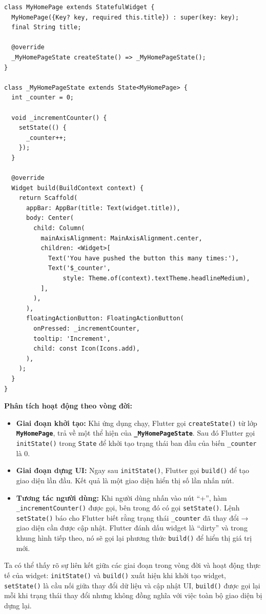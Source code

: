 \documentclass[../DoAn.tex]{subfiles}
\numberwithin{figure}{chapter}
\begin{document}
\begin{lstlisting}
class MyHomePage extends StatefulWidget {
  MyHomePage({Key? key, required this.title}) : super(key: key);
  final String title;

  @override
  _MyHomePageState createState() => _MyHomePageState();
}

class _MyHomePageState extends State<MyHomePage> {
  int _counter = 0;

  void _incrementCounter() {
    setState(() {
      _counter++;
    });
  }

  @override
  Widget build(BuildContext context) {
    return Scaffold(
      appBar: AppBar(title: Text(widget.title)),
      body: Center(
        child: Column(
          mainAxisAlignment: MainAxisAlignment.center,
          children: <Widget>[
            Text('You have pushed the button this many times:'),
            Text('$_counter',
                style: Theme.of(context).textTheme.headlineMedium),
          ],
        ),
      ),
      floatingActionButton: FloatingActionButton(
        onPressed: _incrementCounter,
        tooltip: 'Increment',
        child: const Icon(Icons.add),
      ),
    );
  }
}
\end{lstlisting}

\textbf{Phân tích hoạt động theo vòng đời:}

\begin{itemize}
\item \textbf{Giai đoạn khởi tạo: } Khi ứng dụng chạy, Flutter gọi  \texttt{createState()} từ lớp \textbf{\texttt{MyHomePage}}, trả về một thể hiện của \textbf{\texttt{\_MyHomePageState}}. Sau đó Flutter gọi \texttt{initState()} trong \texttt{State} để khởi tạo trạng thái ban đầu của biến \texttt{\_counter} là 0.
\item \textbf{Giai đoạn dựng UI: } Ngay sau \texttt{initState()}, Flutter gọi \texttt{build()} để tạo giao diện lần đầu. Kết quả là một giao diện hiển thị số lần nhấn nút.
\item \textbf{Tương tác người dùng: } Khi người dùng nhấn vào nút “+”, hàm \texttt{\_incrementCounter()} được gọi, bên trong đó có gọi \texttt{setState()}. Lệnh \texttt{setState()} báo cho Flutter biết rằng trạng thái \texttt{\_counter} đã thay đổi → giao diện cần được cập nhật. Flutter đánh dấu widget là “dirty” và trong khung hình tiếp theo, nó sẽ gọi lại phương thức \texttt{build()} để hiển thị giá trị mới.
\end{itemize}

Ta có thể thấy rõ sự liên kết giữa các giai đoạn trong vòng đời và hoạt động thực tế của widget: \texttt{initState()} và \texttt{build()} xuất hiện khi khởi tạo widget, \texttt{setState()} là cầu nối giữa thay đổi dữ liệu và cập nhật UI, \texttt{build()} được gọi lại mỗi khi trạng thái thay đổi nhưng không đồng nghĩa với việc toàn bộ giao diện bị dựng lại.
\end{document}
